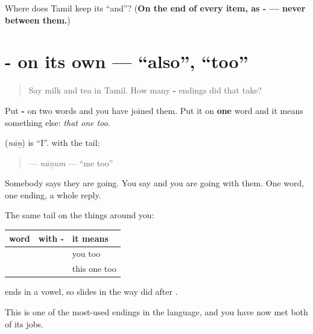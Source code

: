\begin{tcolorbox}[breakable,colback=teal!4,colframe=teal!35!black,title={Before you move on}]
Where does Tamil keep its \textquotedblleft{}and\textquotedblright{}? (\textbf{On the end of every item, as - — never between them.})
\end{tcolorbox}
\section[\texorpdfstring{-\ta{உம்} (-um)}{-உம் (-um)}]{- on its own — \textquotedblleft{}also\textquotedblright{}, \textquotedblleft{}too\textquotedblright{}}

\label{lesson:TA-C74-also}



\begin{quote}
Say milk and tea in Tamil. How many \textbf{-} endings did that take?
\end{quote}

\begin{grammarlens}[title={Grammar lens: one tail, not two}]
Put \textbf{-} on two words and you have joined them. Put it on \textbf{one} word and it means something else: \emph{that one too}.

 (\emph{nāṉ}) is \textquotedblleft{}I\textquotedblright{}.  with the tail:

\begin{quote}
\textbf{} — \emph{nāṉum} — \textquotedblleft{}me too\textquotedblright{}
\end{quote}

Somebody says they are going. You say \textbf{} and you are going with them. One word, one ending, a whole reply.

The same tail on the things around you:

\noindent
\begin{tabularx}{\linewidth}{@{}>{\raggedright\arraybackslash}X>{\raggedright\arraybackslash}X>{\raggedright\arraybackslash}X@{}}
\toprule
\textbf{word} & \textbf{with -\ta{உம்}} & \textbf{it means} \\
\midrule
\ta{நீங்கள்} & \textbf{\ta{நீங்களும்}} & you too \\
\ta{இது} & \textbf{\ta{இதுவும்}} & this one too \\
\bottomrule
\end{tabularx}

 ends in a vowel, so \textbf{} slides in the way \textbf{} did after .

This is one of the most-used endings in the language, and you have now met both of its jobs.
\end{grammarlens}

